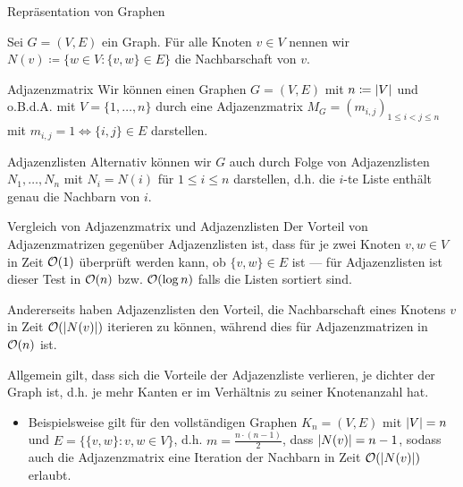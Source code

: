\begin{frame}{Repr\"asentation von Graphen}
\begin{definition}
Sei $G = (V, E)$ ein Graph.
F\"ur alle Knoten $v \in V$ nennen wir $N(v) \coloneqq \{ w \in V : \{v, w\} \in E \}$ die \alert{Nachbarschaft} von $v$.
\end{definition}

\begin{block}{Adjazenzmatrix}
Wir k\"onnen einen Graphen $G = (V, E)$ mit $n \coloneqq \vert V\vert$ und o.B.d.A. mit $V = \{ 1, \dots, n \}$ durch eine \alert{Adjazenzmatrix} $M_G = (m_{i,j})_{1 \leq i < j \leq n}$ mit $m_{i, j} = 1 \iff \{ i, j \} \in E$ darstellen.
\end{block}

\begin{block}{Adjazenzlisten}
Alternativ k\"onnen wir $G$ auch durch Folge von \alert{Adjazenzlisten} $N_1, \dots, N_n$ mit $N_i = N(i)$ f\"ur $1 \leq i \leq n$ darstellen, d.h. die $i$-te Liste enth\"alt genau die Nachbarn von $i$.
\end{block}
\end{frame}

\begin{frame}{Vergleich von Adjazenzmatrix und Adjazenzlisten}
Der Vorteil von Adjazenzmatrizen gegen\"uber Adjazenzlisten ist, dass f\"ur je zwei Knoten $v, w \in V$ in Zeit $\mathcal{O}(1)$ \"uberpr\"uft werden kann, ob $\{ v, w \} \in E$ ist --- f\"ur Adjazenzlisten ist dieser Test in $\mathcal{O}(n)$ bzw. $\mathcal{O}(\log n)$ falls die Listen sortiert sind.

Andererseits haben Adjazenzlisten den Vorteil, die Nachbarschaft eines Knotens $v$ in Zeit $\mathcal{O}(\vert N(v)\vert)$ iterieren zu k\"onnen, w\"ahrend dies f\"ur Adjazenzmatrizen in $\mathcal{O}(n)$ ist.

Allgemein gilt, dass sich die Vorteile der Adjazenzliste verlieren, je \alert{dichter} der Graph ist, d.h. je mehr Kanten er im Verh\"altnis zu seiner Knotenanzahl hat.
\begin{itemize}
    \item Beispielsweise gilt f\"ur den \alert{vollst\"andigen Graphen} $K_n = (V, E)$ mit $\vert V\vert = n$ und $E = \{ \{ v, w \} : v, w \in V \}$, d.h. $m = \frac{n \cdot (n-1)}{2}$, dass $\vert N(v)\vert = n - 1$, sodass auch die Adjazenzmatrix eine Iteration der Nachbarn in Zeit $\mathcal{O}(\vert N(v)\vert)$ erlaubt.
\end{itemize}
\end{frame}

